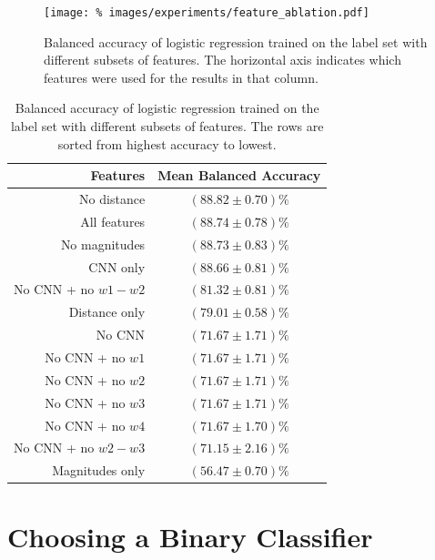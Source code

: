     \begin{figure}[!ht]
      \centering
      \texttt{[image: \%
        images/experiments/feature\_ablation.pdf]}
      \caption{Balanced accuracy of logistic regression trained on the
        \citeauthor{norris06} label set with different subsets of features. The
        horizontal axis indicates which features were used for the results in
        that column.}
      \label{fig:feature-ablation}
    \end{figure}

    \begin{table}[!ht]
      \centering
      \begin{tabular}{r|c}
        \textbf{Features} & \textbf{Mean Balanced Accuracy}\\\hline
        No distance & $(88.82 \pm 0.70)\%$\\
        All features & $(88.74 \pm 0.78)\%$\\
        No magnitudes & $(88.73 \pm 0.83)\%$\\
        CNN only & $(88.66 \pm 0.81)\%$\\
        No CNN + no $w1 - w2$ & $(81.32 \pm 0.81)\%$\\
        Distance only & $(79.01 \pm 0.58)\%$\\
        No CNN & $(71.67 \pm 1.71)\%$\\
        No CNN + no $w1$ & $(71.67 \pm 1.71)\%$\\
        No CNN + no $w2$ & $(71.67 \pm 1.71)\%$\\
        No CNN + no $w3$ & $(71.67 \pm 1.71)\%$\\
        No CNN + no $w4$ & $(71.67 \pm 1.70)\%$\\
        No CNN + no $w2 - w3$ & $(71.15 \pm 2.16)\%$\\
        Magnitudes only & $(56.47 \pm 0.70)\%$\\
      \end{tabular}
      \caption{Balanced accuracy of logistic regression trained on the
        \citeauthor{norris06} label set with different subsets of features. The
        rows are sorted from highest accuracy to lowest.}
      \label{tab:feature-ablation}
    \end{table}

\section{Choosing a Binary Classifier}
\label{sec:binary-classifiers}
  
